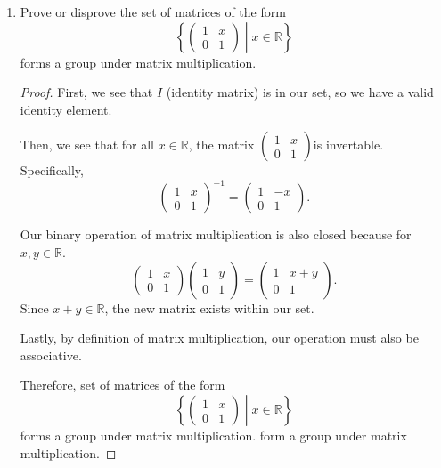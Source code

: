 \documentclass{article}
\begin{document}
\begin{enumerate}
\begin{proof}
            Our binary operation is also closed because for any \(a = 7n, b = 7m\),
            \(a + b = 7n + 7m = 7(n + m) \in S\).

            Lastly, we see that our operation is associative by definition of addition.

            Therefore, \(S\) forms a group under addition.
        \end{proof}

    \item  
        Prove or disprove the set of matrices of the form
      \[         \left\{           \begin{pmatrix}1&x\\0&1\end{pmatrix}           \middle| x \in \mathbb{R}         \right\}       \] forms a group under matrix multiplication.
    
        \begin{proof}
            First, we see that \(I\) (identity matrix) is in our set, so we have a valid identity
            element. 

            Then, we see that for all \(x \in \mathbb{R}\), the matrix \(\begin{pmatrix}1&x\\0&1\end{pmatrix}\)is invertable.
            Specifically,
            \[\begin{pmatrix}1&x\\0&1\end{pmatrix}^{-1} = \begin{pmatrix}1&-x\\0&1\end{pmatrix}.\]

            Our binary operation of matrix multiplication is also closed because
            for \(x, y \in \mathbb{R}\). 
            \[
                \begin{pmatrix}1&x\\0&1\end{pmatrix} \begin{pmatrix}1&y\\0&1\end{pmatrix} = \begin{pmatrix}1&x+y\\0&1\end{pmatrix}.
            \]
            Since \(x + y \in \mathbb{R}\), the new matrix exists within our set.

            Lastly, by definition of matrix multiplication, our operation must 
            also be associative.

            Therefore, set of matrices of the form
      \[         \left\{           \begin{pmatrix}1&x\\0&1\end{pmatrix}           \middle| x \in \mathbb{R}         \right\}       \] forms a group under matrix multiplication.
            form a group under matrix multiplication.

        \end{proof}
    
\end{enumerate}
\end{document}

